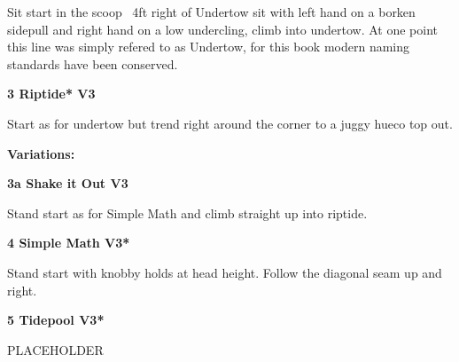 \begin{multicols}{2}
\begin{adjustwidth}{0.5cm}{}
\begin{minipage}{\linewidth}
							\begin{adjustwidth}{0.5cm}{}				
							Sit start in the scoop ~4ft right of Undertow sit with left hand on a borken sidepull and right hand on a low undercling, climb into undertow. At one point this line was simply refered to as Undertow, for this book modern naming standards have been conserved.
							\end{adjustwidth}
							\end{minipage}
						\end{adjustwidth}
					\begin{minipage}{\linewidth}	
					\label{rt:Riptide}
\colorbox{green!20}{
\parbox{0.95\textwidth}{
\textbf{
3 Riptide* V3    
}
}
}

					\begin{adjustwidth}{0.5cm}{}				
					Start as for undertow but trend right around the corner to a juggy hueco top out.
					\end{adjustwidth}
					\end{minipage}
						\begin{adjustwidth}{0.5cm}{}				
						\textbf{Variations:} \newline
							\begin{minipage}{\linewidth}	
							\label{vr:Shake it Out}
\colorbox{green!20}{
\parbox{0.95\textwidth}{
\textbf{
3a Shake it Out V3   
}
}
}

							\begin{adjustwidth}{0.5cm}{}				
							Stand start as for Simple Math and climb straight up into riptide.
							\end{adjustwidth}
							\end{minipage}
						\end{adjustwidth}
					\begin{minipage}{\linewidth}	
					\label{rt:Simple Math}
\colorbox{green!20}{
\parbox{0.95\textwidth}{
\textbf{
4 Simple Math V3*  
}
}
}

					\begin{adjustwidth}{0.5cm}{}				
					Stand start with knobby holds at head height. Follow the diagonal seam up and right.
					\end{adjustwidth}
					\end{minipage}
					\begin{minipage}{\linewidth}	
					\label{rt:Tidepool}
\colorbox{green!20}{
\parbox{0.95\textwidth}{
\textbf{
5 Tidepool V3*  
}
}
}

					\begin{adjustwidth}{0.5cm}{}				
					PLACEHOLDER
					\end{adjustwidth}
					\end{minipage}

\end{multicols}
